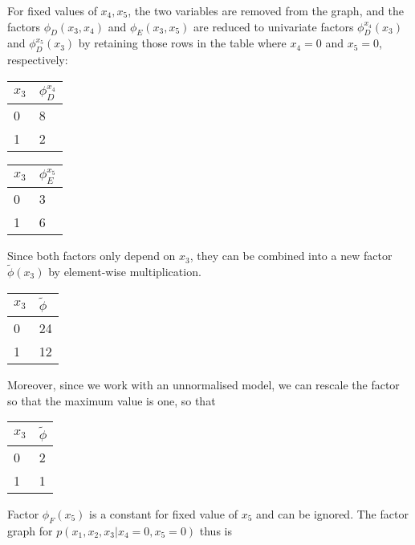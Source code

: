 \begin{exenumerate}
\begin{solution}
      For fixed values of $x_4, x_5$, the two variables are removed
      from the graph, and the factors $\phi_D(x_3,x_4)$ and
      $\phi_E(x_3, x_5)$ are reduced to univariate factors
      $\phi_D^{x_4}(x_3)$ and $\phi_D^{x_5}(x_3)$ by retaining those
      rows in the table where $x_4=0$ and $x_5=0$, respectively:
      \begin{center}
        \begin{tabular}{ll}
          \toprule
          $x_3$ & $\phi_D^{x_4}$\\
          \midrule
          0 & 8\\
          1 & 2\\
          \bottomrule
        \end{tabular}
        \hspace{4ex}
        \begin{tabular}{ll}
          \toprule
          $x_3$ & $\phi_E^{x_5}$\\
          \midrule
          0 & 3\\
          1 & 6\\
          \bottomrule
        \end{tabular}   
      \end{center}
      Since both factors only depend on $x_3$, they can be combined into a new factor $\tilde{\phi}(x_3)$ by element-wise multiplication.
      \begin{center}
        \begin{tabular}{ll}
          \toprule
          $x_3$ & $\tilde{\phi}$\\
          \midrule
          0 & 24\\
          1 & 12\\
          \bottomrule
        \end{tabular}
      \end{center}
      Moreover, since we work with an unnormalised model, we can rescale
      the factor so that the maximum value is one, so that
      \begin{center}
        \begin{tabular}{ll}
          \toprule
          $x_3$ & $\tilde{\phi}$\\
          \midrule
          0 & 2\\
          1 & 1\\
          \bottomrule
        \end{tabular}
      \end{center}
      Factor $\phi_F(x_5)$ is a constant for fixed value of $x_5$ and can be ignored. The factor graph for $p(x_1, x_2, x_3 | x_4=0, x_5=0)$ thus is

\end{solution}
\end{exenumerate}
